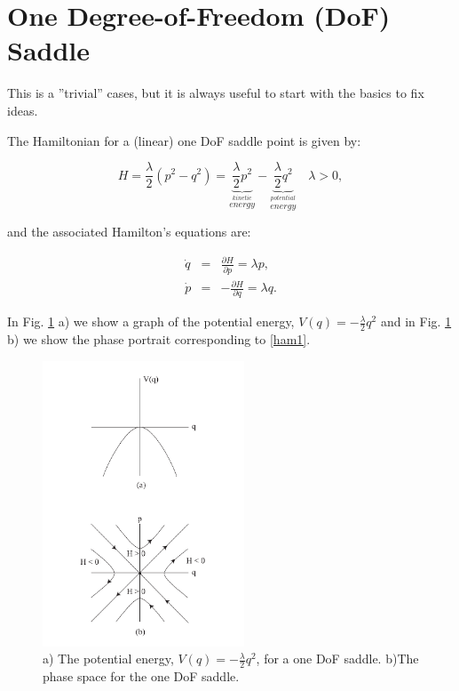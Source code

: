 \documentclass{article}
\begin{document}
\section*{One Degree-of-Freedom (DoF) Saddle}


This is a ''trivial'' cases, but it is always useful to start with the basics to fix ideas.

The Hamiltonian for a (linear) one DoF saddle point is given by:

\begin{equation}
H = \frac{\lambda}{2} \left(p^2 - q^2 \right) =  \underbrace{\frac{\lambda}{2}  p^2}_{\stackrel{kinetic}{ energy}}-  \underbrace{\frac{\lambda}{2}  q^2}_{\stackrel{potential}{ energy}} \quad \lambda >0,
\label{ham1}
\end{equation}



\noindent
and the associated Hamilton's equations are:

\begin{eqnarray}
\dot{q} & = & \frac{\partial H}{\partial p}= \lambda p, \nonumber \\
\dot{p} & = & -\frac{\partial H}{\partial q}= \lambda q.
\label{hameq1}
\end{eqnarray}




\noindent
In Fig. \ref{fig:1 dof saddle} a) we show a graph of the potential energy, $V(q) =-\frac{\lambda}{2} q^2$  and in Fig. \ref{fig:1 dof saddle} b) we show the phase portrait corresponding to \eqref{ham1}. 

\begin{figure}[htb!]
\begin{center}
\includegraphics[width=6.0cm]{fig_1_dof_saddle.pdf}
\end{center}
\caption{a) The potential energy, $V(q) =-\frac{\lambda}{2} q^2$,  for a one DoF saddle. b)The phase space for the one DoF saddle.}
\label{fig:1 dof saddle}
\end{figure}
\end{document}

